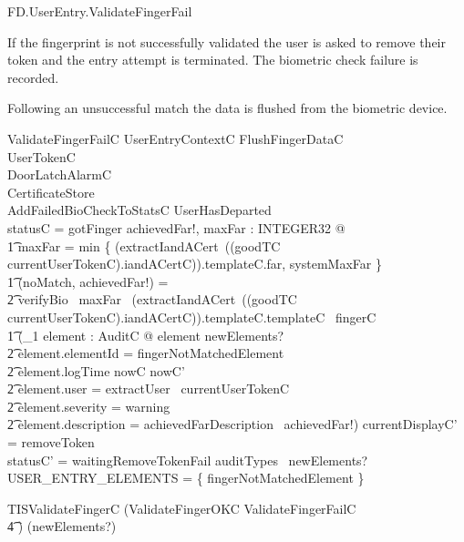 \begin{traceunit}{FD.UserEntry.ValidateFingerFail}
\end{traceunit}


If the fingerprint is not successfully validated the user is asked to
remove their token and the entry attempt is terminated. 
The biometric check failure is recorded.

Following an unsuccessful match the data is flushed from the biometric
device.

\begin{schema}{ValidateFingerFailC}
        UserEntryContextC
\also
        FlushFingerDataC
\\	\Xi UserTokenC
\\      \Xi DoorLatchAlarmC
\\      \Xi CertificateStore
\\      AddFailedBioCheckToStatsC
\where
        \lnot UserHasDeparted
\\        statusC = gotFinger
\also
        \exists achievedFar!, maxFar : INTEGER32 @
\\ \t1     maxFar = min \{  (extractIandACert~((goodTC \inv
                currentUserTokenC).iandACertC)).templateC.far,
        systemMaxFar \}
\\ \t1        \land (noMatch, achievedFar!) = 
\\ \t2                verifyBio~ maxFar~ (extractIandACert~((goodTC \inv
                currentUserTokenC).iandACertC)).templateC.templateC~ fingerC 
\also
\\ \t1  \land (\exists_1 element : AuditC @ element \in newElements? 
\\ \t2  \land element.elementId = fingerNotMatchedElement
\\ \t2  \land element.logTime \in nowC \upto nowC'
\\ \t2  \land element.user = extractUser~ currentUserTokenC
\\ \t2  \land element.severity = warning
\\ \t2  \land element.description = achievedFarDescription~ achievedFar!)
\also
        currentDisplayC' = removeToken
\\      statusC' = waitingRemoveTokenFail
\also
        auditTypes~ newElements? \cap USER\_ENTRY\_ELEMENTS = 
        \{ fingerNotMatchedElement \} 

\end{schema}

\begin{zed}
        TISValidateFingerC  (ValidateFingerOKC \lor ValidateFingerFailC
\\ \t4  \lor [~ UserTokenTornC | statusC = gotFinger ~]) \hide (newElements?)
\end{zed}

